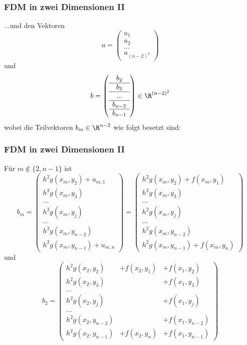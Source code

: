 %
%
\begin{frame}\frametitle{FDM in zwei Dimensionen II}
...und den Vektoren
$$
u=\begin{pmatrix}u_1 \\ u_2 \\ ... \\u_{(n-2)^2} \end{pmatrix}
$$
und 
$$
b=\left( \begin{array}{c} b_2 \\\hline b_3 \\\hline ... \\\hline b_{n-2}\\\hline b_{n-1} \end{array}\right) \in \R^{(n-2)^2}
$$
wobei die Teilvektoren $b_m \in \R^{n-2}$ wie folgt besetzt sind:
\end{frame}
%
%
\begin{frame}\frametitle{FDM in zwei Dimensionen II}
Für $m\notin \{2,n-1\}$ ist
\small
$$
b_m=\left(\begin{array}{l}h^2g(x_m,y_2)+u_{m,1} \\ h^2g(x_m,y_3)\\ ... \\ h^2g(x_m,y_j)\\...\\h^2g(x_m,y_{n-2})\\ h^2g(x_m,y_{n-1})+u_{m,n} \end{array}\right)=\left(\begin{array}{l}h^2g(x_m,y_2)+f(x_m,y_1) \\ h^2g(x_m,y_3)\\ ... \\ h^2g(x_m,y_j)\\...\\h^2g(x_m,y_{n-2})\\ h^2g(x_m,y_{n-1})+f(x_m,y_n) \end{array}\right)
$$
und 
$$
b_2=\left(\begin{array}{lll}h^2g(x_2,y_2)&+f(x_2,y_1)& +f(x_1,y_2)\\ h^2g(x_2,y_3)&&+f(x_1,y_3)\\ ... \\ h^2g(x_2,y_j)&&+f(x_1,y_j)\\...\\h^2g(x_2,y_{n-2})&&+f(x_1,y_{n-2})\\ h^2g(x_2,y_{n-1})&+f(x_2,y_n)&+f(x_1,y_{n-1}) \end{array}\right)
$$
\end{frame}
